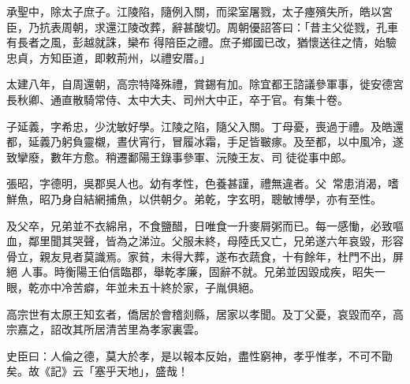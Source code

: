 \begin{pinyinscope}
 承聖中，除太子庶子。江陵陷，隨例入關，而梁室屠戮，太子瘞殯失所，皓以宮臣，乃抗表周朝，求還江陵改葬，辭甚酸切。周朝優詔答曰：「昔主父從戮，孔車有長者之風，彭越就誅，欒布
 得陪臣之禮。庶子鄉國已改，猶懷送往之情，始驗忠貞，方知臣道，即敕荊州，以禮安厝。」



 太建八年，自周還朝，高宗特降殊禮，賞錫有加。除宜都王諮議參軍事，徙安德宮長秋卿、通直散騎常侍、太中大夫、司州大中正，卒于官。有集十卷。



 子延義，字希忠，少沈敏好學。江陵之陷，隨父入關。丁母憂，喪過于禮。及皓還都，延義乃躬負靈櫬，晝伏宵行，冒履冰霜，手足皆皸瘃。及至都，以中風冷，遂致攣廢，數年方愈。稍遷鄱陽王錄事參軍、沅陵王友、司
 徒從事中郎。



 張昭，字德明，吳郡吳人也。幼有孝性，色養甚謹，禮無違者。父，常患消渴，嗜鮮魚，昭乃身自結網捕魚，以供朝夕。弟乾，字玄明，聰敏博學，亦有至性。



 及父卒，兄弟並不衣綿帛，不食鹽醋，日唯食一升麥屑粥而已。每一感慟，必致嘔血，鄰里聞其哭聲，皆為之涕泣。父服未終，母陸氏又亡，兄弟遂六年哀毀，形容骨立，親友見者莫識焉。家貧，未得大葬，遂布衣蔬食，十有餘年，杜門不出，屏絕
 人事。時衡陽王伯信臨郡，舉乾孝廉，固辭不就。兄弟並因毀成疾，昭失一眼，乾亦中冷苦癖，年並未五十終於家，子胤俱絕。



 高宗世有太原王知玄者，僑居於會稽剡縣，居家以孝聞。及丁父憂，哀毀而卒，高宗嘉之，詔改其所居清苦里為孝家裏雲。



 史臣曰：人倫之德，莫大於孝，是以報本反始，盡性窮神，孝乎惟孝，不可不勖矣。故《記》云「塞乎天地」，盛哉！



\end{pinyinscope}